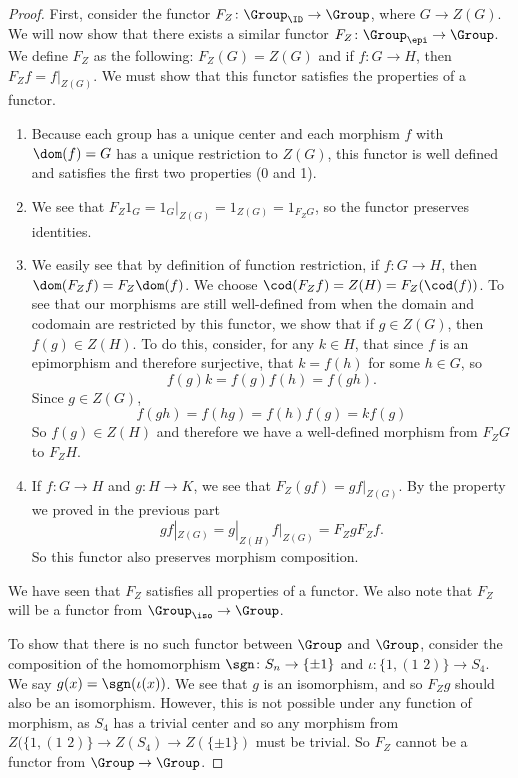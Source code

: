 \documentclass[../../main]{subfiles}
\begin{document}
\begin{proof}

First, consider the functor $F_Z\colon \Group_{\ID}\rightarrow \Group$, where $G \rightarrow Z(G)$. We will now show that there exists a similar functor $F_Z\colon \Group_{\epi} \rightarrow \Group$. We define $F_Z$ as the following: $F_Z(G) = Z(G)$ and if $f\colon G \rightarrow H$, then $F_{Z} f = f|_{Z(G)}$. We must show that this functor satisfies the properties of a functor.
\begin{enumerate}
	\item Because each group has a unique center and each morphism $f$ with
		$\dom(f) = G$ has a unique restriction to $Z(G)$, this functor is well
		defined and satisfies the first two properties (0 and 1).
	\item We see that $F_{Z} 1_{G} = 1_{G}|_{Z(G)} = 1_{Z(G)} = 1_{F_{Z}G}$, so
		the functor preserves identities.
	\item We easily see that by definition of function restriction, if $f\colon
		G \rightarrow H$, then $\dom(F_{Z}f) = F_{Z}\dom(f)$. We choose
		$\cod(F_{Z}f) = Z(H) = F_Z(\cod(f))$. To see that our morphisms are
		still well-defined from when the domain and codomain are restricted by
		this functor, we show that if $g \in Z(G)$, then $f(g) \in Z(H)$. To do
		this, consider, for any $k \in H$, that since $f$ is an epimorphism and
		therefore surjective, that $k = f(h)$ for some $h \in G$, so
		\[f(g)k = f(g)f(h) = f(gh).\] Since $g \in Z(G)$,
		\[f(gh) = f(hg) = f(h)f(g) = kf(g)\]
		So $f(g) \in Z(H)$ and therefore we have a well-defined morphism
		from $F_ZG$ to $F_ZH$.
	\item If $f\colon G \rightarrow H$ and $g\colon H \rightarrow K$, we see
		that $F_Z(gf) = gf|_{Z(G)}$. By the property we proved in the previous
		part \[gf|_{Z(G)} = g|_{Z(H)}f|_{Z(G)} = F_ZgF_Zf.\] So this functor
		also preserves morphism composition.
\end{enumerate}

We have seen that $F_Z$ satisfies all properties of a functor. We also note that
$F_Z$ will be a functor from $\Group_{\iso} \rightarrow \Group$.

To show that there is no such functor between $\Group$ and $\Group$, consider the
composition of the homomorphism $\sgn\colon S_n \rightarrow \{ \pm 1 \} $ and
$\iota\colon \{1, (1 \,\, 2) \} \rightarrow S_4$. We say $ g(x) =
\sgn(\iota(x))$. We see that $g$ is an isomorphism, and so $F_Zg$ should also be
an isomorphism. However, this is not possible under any function of morphism, as
$S_4$ has a trivial center and so any morphism from $Z(\{1, (1\,\,2)\}
\rightarrow Z(S_4) \rightarrow Z(\{\pm 1\})$ must be trivial. So $F_Z$ cannot be
a functor from $\Group \rightarrow \Group$.


\end{proof}
\end{document}
